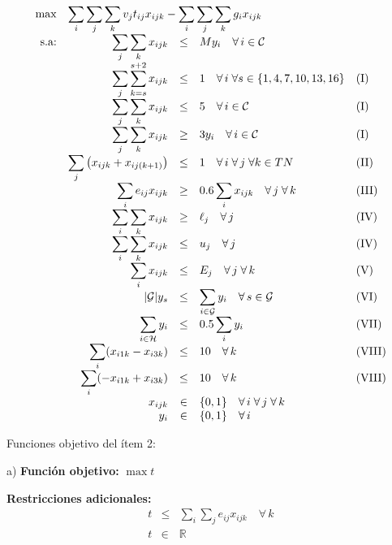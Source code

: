 \documentclass{article}
\newcommand{\dsum}{\displaystyle\sum}
\begin{document}
\[\begin{array}{rrcll}
    \max & \multicolumn{4}{l}{\dsum_i\dsum_j\dsum_k v_jt_{ij}x_{ijk} - \dsum_i\dsum_j\dsum_{k} g_ix_{ijk}}   \\
    \text{s.a:} & \dsum_j\dsum_k x_{ijk} & \leq & My_i \quad \forall\,i\in\mathcal{C}&  \\
     & \dsum_j\dsum_{k=s}^{s+2} x_{ijk} & \leq & 1 \quad \forall\,i\;\forall s\in\{1,4,7,10,13,16\} & \text{(I)} \\
     & \dsum_j\dsum_k x_{ijk} & \leq & 5 \quad \forall\,i\in\mathcal{C}& \text{(I)}  \\
     & \dsum_j\dsum_k x_{ijk} & \geq & 3y_i \quad \forall\,i\in\mathcal{C} & \text{(I)}  \\
     & \dsum_j \left(x_{ijk} + x_{ij(k+1)}\right)& \leq & 1 \quad \forall\,i\;\forall\,j\;\forall k\in TN & \text{(II)} \\
     & \dsum_i e_{ij}x_{ijk}& \geq & 0.6\dsum_i x_{ijk} \quad \forall\,j\;\forall\,k & \text{(III)}  \\
     & \dsum_i\dsum_k x_{ijk}& \geq & \ell_j \quad \forall\,j & \text{(IV)}  \\
     & \dsum_i\dsum_k x_{ijk}& \leq & u_j \quad \forall\,j & \text{(IV)}  \\
     & \dsum_i x_{ijk} & \leq & E_j \quad \forall\,j\;\forall\, k & \text{(V)}  \\
     & |\mathcal{G}|y_s & \leq & \dsum_{i\in\mathcal{G}} y_i \quad \forall\,s\in\mathcal{G}  & \text{(VI)}  \\
     & \dsum_{i\in \mathcal{H}} y_i& \leq & 0.5\dsum_i y_i &  \text{(VII)}\\
     & \dsum_{i} (x_{i1k} - x_{i3k}) & \leq & 10 \quad \forall\,k & \text{(VIII)}  \\
     & \dsum_{i} (-x_{i1k} + x_{i3k}) & \leq & 10 \quad \forall\,k & \text{(VIII)}  \\
     & x_{ijk} & \in & \{0,1\} \quad \forall\,i\;\forall\,j\;\forall\,k & \\
     & y_{i} & \in & \{0,1\} \quad \forall\,i & \\
\end{array}\]

Funciones objetivo del ítem 2:

a) \textbf{Función objetivo:} $\max t$

\textbf{Restricciones adicionales:}
\[
\begin{array}{rcl}
    t & \leq & \dsum_{i}\dsum_j e_{ij}x_{ijk} \quad \forall\,k  \\
    t & \in & \mathbb{R}
\end{array}
\]
\end{document}
